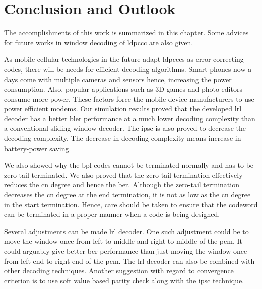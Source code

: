 \chapter{Conclusion and Outlook}\label{ch:conclu}
The accomplishments of this work is summarized in this chapter. Some advices for future works in window decoding of \gls{ldpccc} are also given.

As mobile cellular technologies in the future adapt \glspl{ldpccc} as error-correcting codes, there will be needs for efficient decoding algorithms. Smart phones now-a-days come with multiple cameras and sensors hence, increasing the power consumption. Also, popular applications such as 3D games and photo editors consume more power. These factors force the mobile device manufacturers to use power efficient modems. Our simulation results proved that the developed \acrfull{lrl} decoder has a better \acrfull{bler} performance at a much lower decoding complexity than a conventional sliding-window decoder. The \acrfull{ipsc} is also proved to decrease the decoding complexity. The decrease in decoding complexity means increase in battery-power saving.

We also showed why the \gls{bpl} codes cannot be terminated normally and has to be zero-tail terminated. We also proved that the zero-tail termination effectively reduces the \gls{cn} degree and hence the \acrfull{ber}. Although the zero-tail termination decreases the \gls{cn} degree at the end termination, it is not as low as the \gls{cn} degree in the start termination. Hence, care should be taken to ensure that the codeword can be terminated in a proper manner when a code is being designed.

Several adjustments can be made \gls{lrl} decoder. One such adjustment could be to move the window once from left to middle and right to middle of the \gls{pcm}. It could arguably give better \gls{ber} performance than just moving the window once from left end to right end of the \gls{pcm}. The \gls{lrl} decoder can also be combined with other decoding techniques. Another suggestion with regard to convergence criterion is to use soft value based parity check along with the \gls{ipsc} technique.